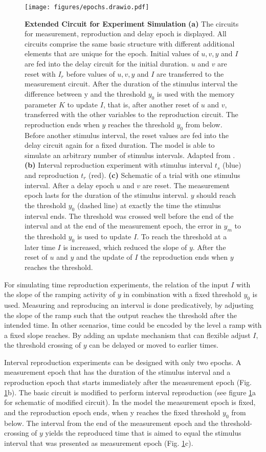 \documentclass[9pt]{article}
\begin{document}
\begin{figure}
	\centering
	\texttt{[image: figures/epochs.drawio.pdf]}
	\caption{\textbf{Extended Circuit for Experiment Simulation} 
	\textbf{(a)} The circuits for measurement, reproduction and delay epoch is displayed. All circuits comprise the same basic structure with different additional elements that are unique for the epoch. Initial values of $u, v, y$ and $I$ are fed into the delay circuit for the initial duration. $u$ and $v$ are reset with $I_r$ before values of $u, v, y$ and $I$ are transferred to the measurement circuit. After the duration of the stimulus interval the difference between y and the threshold $y_0$ is used with the memory parameter $K$ to update $I$, that is, after another reset of $u$ and $v$, transferred with the other variables to the reproduction circuit. The reproduction ends when $y$ reaches the threshold $y_0$ from below. Before another stimulus interval, the reset values are fed into the delay circuit again for a fixed duration. The model is able to simulate an arbitrary number of stimulus intervals. Adapted from \cite{Petzschner2015}.
	\textbf{(b)} Interval reproduction experiment with stimulus interval $t_s$ (blue) and reproduction $t_r$ (red).
	\textbf{(c)} Schematic of a trial with one stimulus interval. After a delay epoch $u$ and $v$ are reset. The measurement epoch lasts for the duration of the stimulus interval. $y$ should reach the threshold $y_0$ (dashed line) at exactly the time the stimulus interval ends. The threshold was crossed well before the end of the interval and at the end of the measurement epoch, the error in $y_m$ to the threshold $y_0$ is used to update $I$. To reach the threshold at a later time $I$ is increased, which reduced the slope of $y$. After the reset of $u$ and $y$ and the update of $I$ the reproduction ends when $y$ reaches the threshold.}
\label{fig:epochs}
\end{figure}

For simulating time reproduction experiments, the relation of the input $I$ with the slope of the ramping activity of $y$ in combination with a fixed threshold $y_0$ is used.
Measuring and reproducing an interval is done predicatively, by adjusting the slope of the ramp such that the output reaches the threshold after the intended time. In other scenarios, time could be encoded by the level a ramp with a fixed slope reaches. 
By adding an update mechanism that can flexible adjust $I$, the threshold crossing of $y$ can be delayed or moved to earlier times.

Interval reproduction experiments can be designed with only two epochs. A measurement epoch that has the duration of the stimulus interval and a reproduction epoch that starts immediately after the measurement epoch (Fig. \ref{fig:epochs}b). 
The basic circuit is modified to perform interval reproduction (see figure \ref{fig:epochs}a for schematic of modified circuit).
In the model the measurement epoch is fixed, and the reproduction epoch ends, when y reaches the fixed threshold $y_0$ from below. 
The interval from the end of the measurement epoch and the threshold-crossing of $y$ yields the reproduced time that is aimed to equal the stimulus interval that was presented as measurement epoch (Fig. \ref{fig:epochs}c).
\end{document}

